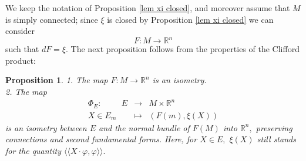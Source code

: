 \documentclass{amsart}
\newtheorem{prop}[lem]{Proposition}
\begin{document}
We keep the notation of Proposition \ref{lem xi closed}, and moreover assume that $M$ is simply connected; since $\xi$ is closed by Proposition \ref{lem xi closed}  we can consider 
$$F:M\rightarrow{\mathbb{R}}^n$$ 
such that $dF=\xi.$ The next proposition follows from the properties of the Clifford product:
\begin{prop}\label{lem F isometry}
1. The map $F:M\rightarrow {\mathbb{R}}^n$ is an isometry.
\\2. The map
\begin{eqnarray*}
\Phi_E:\hspace{1cm} E&\rightarrow& M\times{\mathbb{R}}^n\\
X\in E_m&\mapsto& (F(m),\xi(X)) 
\end{eqnarray*}
is an isometry between $E$ and the normal  bundle of $F(M)$ into ${\mathbb{R}}^n,$ preserving connections and second fundamental forms. Here, for $X\in E,$ $\xi(X)$ still stands for the quantity $\langle\langle X\cdot\varphi,\varphi\rangle\rangle.$
\end{prop}
\end{document}
